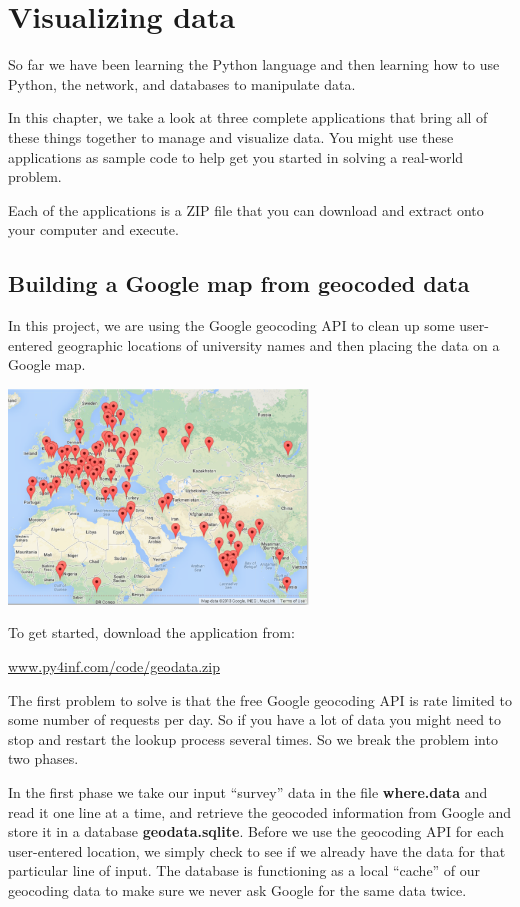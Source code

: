 \documentclass[11pt]{book}
\begin{document}
\chapter{Visualizing data}

So far we have been learning the Python language and then 
learning how to use Python, the network, and databases 
to manipulate data.

In this chapter, we take a look at 
three 
complete applications that bring all of these things together
to manage and visualize data.  You  might use these applications 
as sample code to help get you started in solving a
real-world problem.

Each of the applications is a ZIP file that you can download
and extract onto your computer and execute.

\section{Building a Google map from geocoded data}

In this project, we are using the Google geocoding API
to clean up some user-entered geographic locations of 
university names and then placing the data on a Google
map.  

\beforefig
\centerline{\includegraphics[height=2.25in]{figs2/google-map.eps}}
\afterfig

To get started, download the application from:

\url{www.py4inf.com/code/geodata.zip}

The first problem to solve is that the free Google geocoding
API is rate limited to some number of requests per day.  So if you have
a lot of data you might need to stop and restart the lookup
process several times.  So we break the problem into two
phases.  

In the first phase we take our input ``survey'' data in the file
{\bf where.data} and read it one line at a time, and retrieve the
geocoded information from Google and store it 
in a database {\bf geodata.sqlite}.
Before we use the geocoding API for each user-entered location, 
we simply check to see if we already have the data for that 
particular line of input.  The database is functioning as a 
local ``cache'' of our geocoding data to make sure we never ask 
Google for the same data twice.
\end{document}
